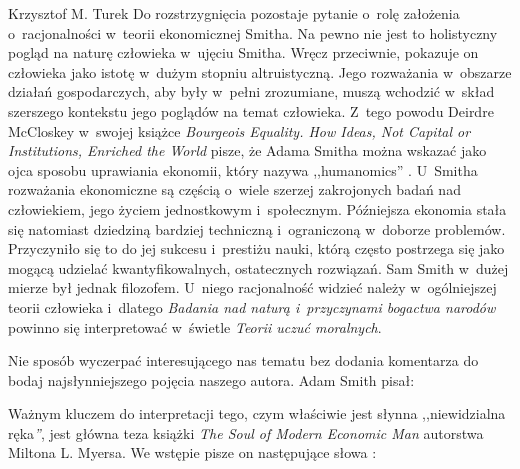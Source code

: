 \begin{artplenv}{Krzysztof M. Turek}
Do rozstrzygnięcia pozostaje pytanie o~rolę założenia o~racjonalności w~teorii ekonomicznej Smitha. Na pewno nie jest to
holistyczny pogląd na naturę człowieka w~ujęciu Smitha. Wręcz przeciwnie, pokazuje on człowieka jako istotę w~dużym
stopniu altruistyczną. Jego rozważania w~obszarze działań gospodarczych, aby były w~pełni zrozumiane, muszą
wchodzić w~skład szerszego kontekstu jego poglądów na temat człowieka. Z~tego powodu Deirdre McCloskey w~swojej książce
\textit{Bourgeois Equality. How Ideas, Not Capital or Institutions, Enriched the World }pisze, że Adama Smitha można
wskazać jako ojca sposobu uprawiania ekonomii, który nazywa ,,humanomics''
\parencite[s.~20]{mccloskey_bourgeois_2016}.
U~Smitha rozważania ekonomiczne są częścią o~wiele szerzej zakrojonych badań nad człowiekiem, jego życiem
jednostkowym i~społecznym. Późniejsza ekonomia stała się natomiast dziedziną bardziej
techniczną i~ograniczoną w~doborze problemów. Przyczyniło się to do jej sukcesu i~prestiżu nauki,
którą często postrzega się jako mogącą udzielać
kwantyfikowalnych, ostatecznych rozwiązań. Sam Smith w~dużej mierze był jednak filozofem. U~niego racjonalność widzieć
należy w~ogólniejszej teorii człowieka i~dlatego \textit{Badania nad naturą i~przyczynami bogactwa narodów} powinno się
interpretować w~świetle \textit{Teorii uczuć moralnych}.

Nie sposób wyczerpać interesującego nas tematu bez dodania komentarza do bodaj najsłynniejszego pojęcia naszego autora.
Adam Smith
\parencite*[s.~46]{smith_badania_2007}
pisał:

Ważnym kluczem do interpretacji tego, czym właściwie jest słynna ,,niewidzialna ręka\textit{''}, jest główna teza książki
\textit{The Soul of Modern Economic Man} autorstwa Miltona L. Myersa. We wstępie pisze on następujące słowa
\parencite[s.~2]{myers_soul_1983}:



\end{artplenv}
